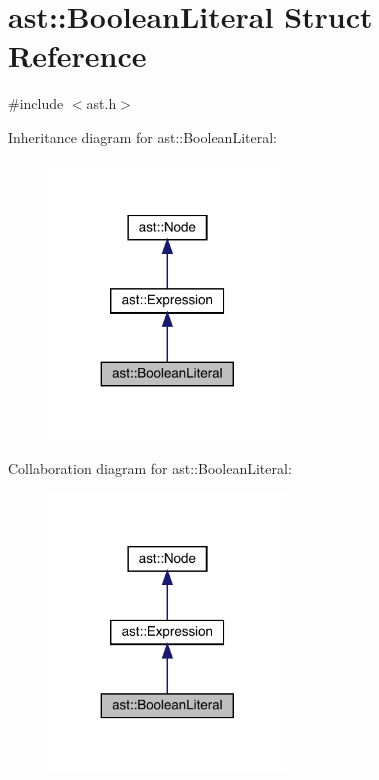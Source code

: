 \hypertarget{structast_1_1_boolean_literal}{}\section{ast\+:\+:Boolean\+Literal Struct Reference}
\label{structast_1_1_boolean_literal}


{\ttfamily \#include $<$ast.\+h$>$}



Inheritance diagram for ast\+:\+:Boolean\+Literal\+:
\nopagebreak
\begin{figure}[H]
\begin{center}
\leavevmode
\includegraphics[width=179pt]{structast_1_1_boolean_literal__inherit__graph}
\end{center}
\end{figure}


Collaboration diagram for ast\+:\+:Boolean\+Literal\+:
\nopagebreak
\begin{figure}[H]
\begin{center}
\leavevmode
\includegraphics[width=179pt]{structast_1_1_boolean_literal__coll__graph}
\end{center}
\end{figure}

